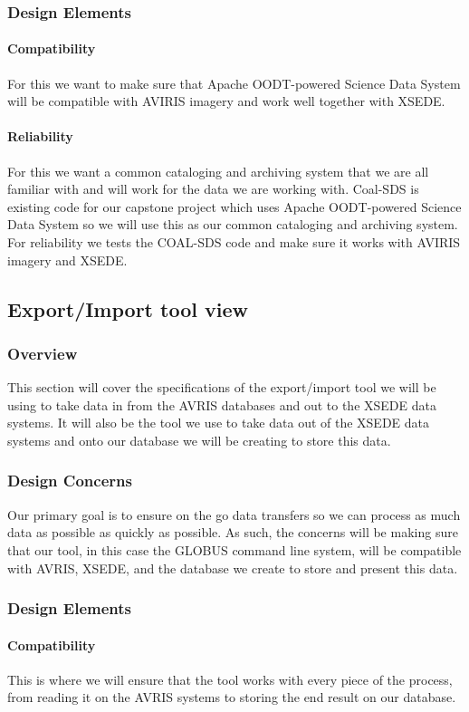 \documentclass[10pt,draftclsnofoot,onecolumn,journal,compsoc]{IEEEtran}
\begin{document}
\subsubsection{Design Elements}
\paragraph{Compatibility}
\noindent For this we want to make sure that Apache OODT-powered Science Data System will be compatible with AVIRIS imagery and work well together with XSEDE.
\paragraph{Reliability}
\noindent For this we want a common cataloging and archiving system that we are all familiar with and will work for the data we are working with. Coal-SDS is existing code for our capstone project which uses Apache OODT-powered Science Data System so we will use this as our common cataloging and archiving system. For reliability we tests the COAL-SDS code and make sure it works with AVIRIS imagery and XSEDE.

\subsection{Export/Import tool view}
\subsubsection{Overview}
This section will cover the specifications of the export/import tool we will be using to take data in from the AVRIS databases and out to the XSEDE data systems. It will also be the tool we use to take data out of the XSEDE data systems and onto our database we will be creating to store this data.
\subsubsection{Design Concerns}
Our primary goal is to ensure on the go data transfers so we can process as much data as possible as quickly as possible. As such, the concerns will be making sure that our tool, in this case the GLOBUS command line system, will be compatible with AVRIS, XSEDE, and the database we create to store and present this data.
\subsubsection{Design Elements}
\paragraph{Compatibility}
This is where we will ensure that the tool works with every piece of the process, from reading it on the AVRIS systems to storing the end result on our database.
\end{document}
